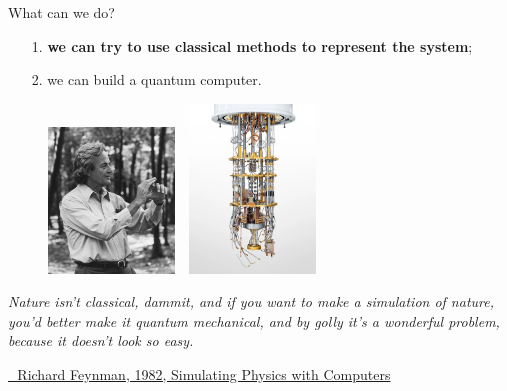 \documentclass[aspectratio=169, 8pt, xcolor={svgnames}, hyperref={linkcolor=black}]{beamer}
\begin{document}
\begin{frame}{What can we do?}
\begin{itemize}[noitemsep]
\item[1.] \textbf{\textcolor{amethyst}{we can try to use classical methods to represent the system}};
\item[2.] we can build a quantum computer.
\end{itemize}
\begin{figure}
   \includegraphics[width=0.3\textwidth, height=0.55\textheight]{figures/feynmann.jpg}%
   $\,\,$ 
   \includegraphics[width=0.3\textwidth, height=0.55\textheight]{figures/qcomp.png}
\end{figure}
\small
\textit{Nature isn't classical, dammit, and if you want to make a simulation of nature, 
you'd better make it quantum mechanical, and by golly it's a wonderful problem, 
because it doesn't look so easy.} 

\href{https://link.springer.com/article/10.1007/BF02650179}{\faBook\,\, Richard Feynman, 1982, Simulating Physics with Computers}
\end{frame}
\end{document}
